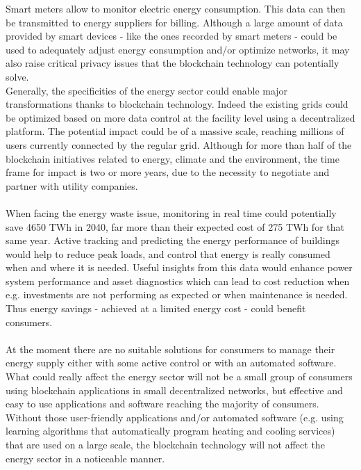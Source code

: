 \documentclass[11pt]{article}
\begin{document}
Smart meters allow to monitor electric energy consumption. This data can then be transmitted to energy suppliers for billing. Although a large amount of data provided by smart devices - like the ones recorded by smart meters - could be used to adequately adjust energy consumption and/or optimize networks, it may also raise critical privacy issues \cite{4} that the blockchain technology can potentially solve.\\
Generally, the specificities of the energy sector could enable major transformations thanks to blockchain technology. Indeed the existing grids could be optimized based on more data control at the facility level using a decentralized platform. The potential impact could be of a massive scale, reaching millions of users currently connected by the regular grid. Although for more than half of the blockchain initiatives related to energy, climate and the environment, the time frame for impact is two or more years, due to the necessity to negotiate and partner with utility companies.\cite{5}\\\\
When facing the energy waste issue, monitoring in real time could potentially save 4650 TWh in 2040, far more than their expected cost of 275 TWh for that same year. Active tracking and predicting the energy performance of buildings would help to reduce peak loads, and control that energy is really consumed when and where it is needed. Useful insights from this data would enhance power system performance and asset diagnostics which can lead to cost reduction when e.g. investments are not performing as expected or when maintenance is needed. Thus energy savings - achieved at a limited energy cost - could benefit consumers.\cite{6}\\\\
At the moment there are no suitable solutions for consumers to manage their energy supply either with some active control or with an automated software. What could really affect the energy sector will not be a small group of consumers using blockchain applications in small decentralized networks, but effective and easy to use applications and software reaching the majority of consumers. Without those user-friendly applications and/or automated software (e.g. using learning algorithms that automatically program heating and cooling services) that are used on a large scale, the blockchain technology will not affect the energy sector in a noticeable manner.\cite{7}\\\\
\end{document}
